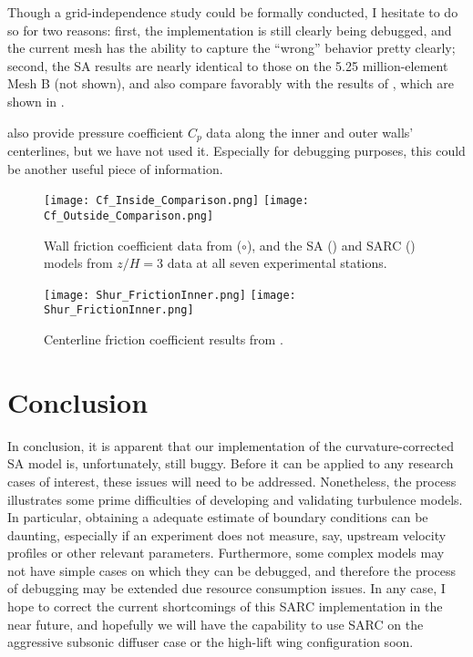 \documentclass[11pt]{article}
\begin{document}
Though a grid-independence study could be formally conducted, I hesitate to do so for two reasons: first, the implementation is still clearly being debugged, and the current mesh has the ability to capture the ``wrong'' behavior pretty clearly; second, the SA results are nearly identical to those on the 5.25 million-element Mesh B (not shown), and also compare favorably with the results of \citep{shur2000}, which are shown in .

\citet{kim1994} also provide pressure coefficient $C_p$ data along the inner and outer walls' centerlines, but we have not used it. Especially for debugging purposes, this could be another useful piece of information.

\begin{figure}[h!]
\centering
\texttt{[image: Cf\_Inside\_Comparison.png]}
\texttt{[image: Cf\_Outside\_Comparison.png]}
\caption{Wall friction coefficient data from \citet{kim1994} ($\circ$), and the SA ({\color{blue}\solidrule[6mm]}) and SARC ({\color{red}\dashrule}) models from $z/H=3$ data at all seven experimental stations.}
\label{fig:Cf_Centerlines}
\end{figure}

\begin{figure}[h!]
\centering
\texttt{[image: Shur\_FrictionInner.png]}
\texttt{[image: Shur\_FrictionInner.png]}
\caption{Centerline friction coefficient results from \citet{shur2000}.}
\label{fig:Shur_Results}
\end{figure}

\section{Conclusion}

In conclusion, it is apparent that our implementation of the curvature-corrected SA model is, unfortunately, still buggy. Before it can be applied to any research cases of interest, these issues will need to be addressed. Nonetheless, the process illustrates some prime difficulties of developing and validating turbulence models. In particular, obtaining a adequate estimate of boundary conditions can be daunting, especially if an experiment does not measure, say, upstream velocity profiles or other relevant parameters. Furthermore, some complex models may not have simple cases on which they can be debugged, and therefore the process of debugging may be extended due resource consumption issues. In any case, I hope to correct the current shortcomings of this SARC implementation in the near future, and hopefully we will have the capability to use SARC on the aggressive subsonic diffuser case or the high-lift wing configuration soon.





\end{document}
